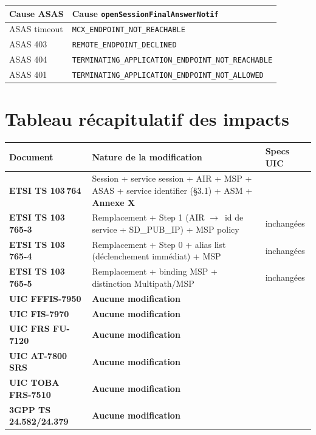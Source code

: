 \documentclass[11pt,a4paper]{article}
\newcommand{\cmark}{\ding{51}}
\newcommand{\arr}{$\to$}
\begin{document}
\begin{longtable}{p{5.5cm} p{8cm}}
  \toprule Cause ASAS & Cause \texttt{openSessionFinalAnswerNotif} \\ \midrule \endhead
  ASAS timeout & \texttt{MCX\_ENDPOINT\_NOT\_REACHABLE} \\
  ASAS 403 & \texttt{REMOTE\_ENDPOINT\_DECLINED} \\
  ASAS 404 & \texttt{TERMINATING\_APPLICATION\_ENDPOINT\_NOT\_REACHABLE} \\
  ASAS 401 & \texttt{TERMINATING\_APPLICATION\_ENDPOINT\_NOT\_ALLOWED} \\
  \bottomrule
\end{longtable}

\section{Tableau récapitulatif des impacts}

\begin{longtable}{p{5cm} p{6.5cm} p{2cm}}
  \toprule Document & Nature de la modification & Specs UIC \\ \midrule \endhead
  \textbf{ETSI TS 103\,764} & Session + service session + AIR + MSP + ASAS +
    service identifier (§3.1) + ASM + \textbf{Annexe X} & \\
  \textbf{ETSI TS 103\,765-3} & Remplacement + Step 1
    (AIR \arr\ id de service + SD\_PUB\_IP) + MSP policy & inchangées \\
  \textbf{ETSI TS 103\,765-4} & Remplacement + Step 0 +
    alias list (déclenchement immédiat) + MSP & inchangées \\
  \textbf{ETSI TS 103\,765-5} & Remplacement + binding MSP +
    distinction Multipath/MSP & inchangées \\
  \textbf{UIC FFFIS-7950} & \textbf{Aucune modification} & \cmark \\
  \textbf{UIC FIS-7970} & \textbf{Aucune modification} & \cmark \\
  \textbf{UIC FRS FU-7120} & \textbf{Aucune modification} & \cmark \\
  \textbf{UIC AT-7800 SRS} & \textbf{Aucune modification} & \cmark \\
  \textbf{UIC TOBA FRS-7510} & \textbf{Aucune modification} & \cmark \\
  \textbf{3GPP TS 24.582/24.379} & \textbf{Aucune modification} & \\
  \bottomrule
\end{longtable}
\end{document}
